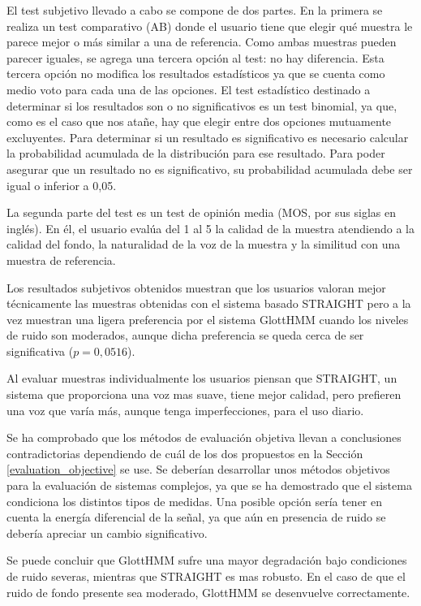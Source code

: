 \begin{resumencastellano}[english]
El test subjetivo llevado a cabo se compone de dos partes.
%
En la primera se realiza un test comparativo (AB) donde el usuario tiene que elegir qu\'e muestra le parece mejor o m\'as similar a una de referencia.
%
Como ambas muestras pueden parecer iguales, se agrega una tercera opci\'on al test: no hay diferencia.
%
Esta tercera opci\'on no modifica los resultados estad\'isticos ya que se cuenta como medio voto para cada una de las opciones.
%
El test estad\'istico destinado a determinar si los resultados son o no significativos es un test binomial, ya que, como es el caso que nos ata\~ne, hay que elegir entre dos opciones mutuamente excluyentes.
%
Para determinar si un resultado es significativo es necesario calcular la probabilidad acumulada de la distribuci\'on para ese resultado.
%
Para poder asegurar que un resultado no es significativo, su probabilidad acumulada debe ser igual o inferior a 0,05.

La segunda parte del test es un test de opini\'on media (MOS, por sus siglas en ingl\'es).
%
En \'el, el usuario eval\'ua del 1 al 5 la calidad de la muestra atendiendo a la calidad del fondo, la naturalidad de la voz de la muestra y la similitud con una muestra de referencia.

Los resultados subjetivos obtenidos muestran que los usuarios valoran mejor t\'ecnicamente las muestras obtenidas con el sistema basado STRAIGHT pero a la vez muestran una ligera preferencia por el sistema GlottHMM cuando los niveles de ruido son moderados, aunque dicha preferencia se queda cerca de ser significativa ($p = 0,0516$).


Al evaluar muestras individualmente los usuarios piensan que STRAIGHT, un sistema que proporciona una voz mas suave, tiene mejor calidad, pero prefieren una voz que var\'ia m\'as, aunque tenga imperfecciones, para el uso diario.

Se ha comprobado que los m\'etodos de evaluaci\'on objetiva llevan a conclusiones contradictorias dependiendo de cu\'al de los dos propuestos en la Secci\'on \ref{evaluation_objective} se use.
%
Se deber\'ian desarrollar unos m\'etodos objetivos para la evaluaci\'on de sistemas complejos, ya que se ha demostrado que el sistema condiciona los distintos tipos de medidas.
%
Una posible opci\'on ser\'ia tener en cuenta la energ\'ia diferencial de la se\~nal, ya que a\'un en presencia de ruido se deber\'ia apreciar un cambio significativo.

Se puede concluir que GlottHMM sufre una mayor degradaci\'on bajo condiciones de ruido severas, mientras que STRAIGHT es mas robusto.
%
En el caso de que el ruido de fondo presente sea moderado, GlottHMM se desenvuelve correctamente.


\end{resumencastellano}